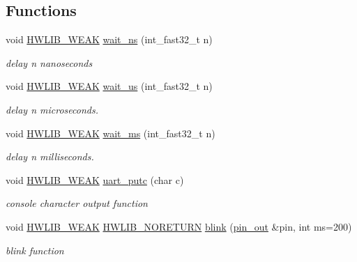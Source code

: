 \subsection*{Functions}
\begin{DoxyCompactItemize}
\item 
void \hyperlink{hwlib-defines_8hpp_a04be4340016df60d6636c1d1c6d94fc9}{H\+W\+L\+I\+B\+\_\+\+W\+E\+AK} \hyperlink{namespacehwlib_a9c01a1d0319f5eadd8926e66aea19aa0}{wait\+\_\+ns} (int\+\_\+fast32\+\_\+t n)
\begin{DoxyCompactList}\small\item\em delay n nanoseconds \end{DoxyCompactList}\item 
void \hyperlink{hwlib-defines_8hpp_a04be4340016df60d6636c1d1c6d94fc9}{H\+W\+L\+I\+B\+\_\+\+W\+E\+AK} \hyperlink{namespacehwlib_a0096b739fc566c896366ecbd3113cc1e}{wait\+\_\+us} (int\+\_\+fast32\+\_\+t n)
\begin{DoxyCompactList}\small\item\em delay n microseconds. \end{DoxyCompactList}\item 
void \hyperlink{hwlib-defines_8hpp_a04be4340016df60d6636c1d1c6d94fc9}{H\+W\+L\+I\+B\+\_\+\+W\+E\+AK} \hyperlink{namespacehwlib_a6119aa5d3034176aa1515ef4bb193044}{wait\+\_\+ms} (int\+\_\+fast32\+\_\+t n)
\begin{DoxyCompactList}\small\item\em delay n milliseconds. \end{DoxyCompactList}\item 
void \hyperlink{hwlib-defines_8hpp_a04be4340016df60d6636c1d1c6d94fc9}{H\+W\+L\+I\+B\+\_\+\+W\+E\+AK} \hyperlink{namespacehwlib_ae568ebef4b8d8a77cecae8cea595896f}{uart\+\_\+putc} (char c)
\begin{DoxyCompactList}\small\item\em console character output function \end{DoxyCompactList}\item 
void \hyperlink{hwlib-defines_8hpp_a04be4340016df60d6636c1d1c6d94fc9}{H\+W\+L\+I\+B\+\_\+\+W\+E\+AK} \hyperlink{hwlib-defines_8hpp_aef311f1f416fdcbd1fa22376dcc01029}{H\+W\+L\+I\+B\+\_\+\+N\+O\+R\+E\+T\+U\+RN} \hyperlink{namespacehwlib_a80ba9dfd5a09c9da29bcc865a5fc85ff}{blink} (\hyperlink{classhwlib_1_1pin__out}{pin\+\_\+out} \&pin, int ms=200)
\begin{DoxyCompactList}\small\item\em blink function \end{DoxyCompactList}\item 

\end{DoxyCompactItemize}
